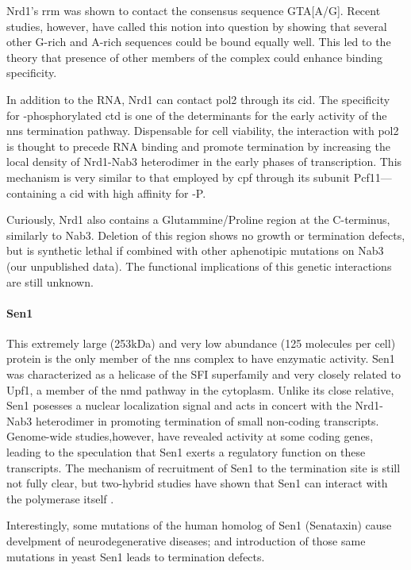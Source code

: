 Nrd1's \gls{rrm} was shown \invivo{} to contact the consensus sequence GTA[A/G].
Recent \invitro{} studies, however, have called this notion into question by showing that several other G-rich and A-rich sequences could be bound equally well.
This led to the theory that presence of other members of the complex could enhance binding specificity.

In addition to the RNA, Nrd1 can contact \gls{pol2} through its \gls{cid}. 
The specificity for \serf{}-phosphorylated \gls{ctd} is one of the determinants for the early activity of the \gls{nns} termination pathway. 
Dispensable for cell viability, the interaction with \gls{pol2} is thought to precede RNA binding and promote termination by increasing the local density of Nrd1-Nab3 heterodimer in the early phases of transcription.
This mechanism is very similar to that employed by \gls{cpf} through its subunit Pcf11---containing a \gls{cid} with high affinity for \sert{}-P.
 
Curiously, Nrd1 also contains a Glutammine/Proline region at the C-terminus, similarly to Nab3. 
Deletion of this region shows no growth or termination defects, but is synthetic lethal if combined with other aphenotipic mutations on Nab3 (our unpublished data).
The functional implications of this genetic interactions are still unknown. 

\paragraph{Sen1}

This extremely large (253kDa) and very low abundance (125 molecules per cell) protein is the only member of the \gls{nns} complex to have enzymatic activity.
Sen1 was characterized as a helicase of the SFI superfamily and very closely related to Upf1, a member of the \gls{nmd} pathway in the cytoplasm.
Unlike its close relative, Sen1 posesses a nuclear localization signal and acts in concert with the Nrd1-Nab3 heterodimer in promoting termination of small non-coding transcripts.
Genome-wide studies,however, have revealed activity at some coding genes, leading to the speculation that Sen1 exerts a regulatory function on these transcripts. 
The mechanism of recruitment of Sen1 to the termination site is still not fully clear, but two-hybrid studies have shown that Sen1 can interact with the polymerase itself . 

Interestingly, some mutations of the human homolog of Sen1 (Senataxin) cause develpment of neurodegenerative diseases; and introduction of those same mutations in yeast Sen1 leads to termination defects.

